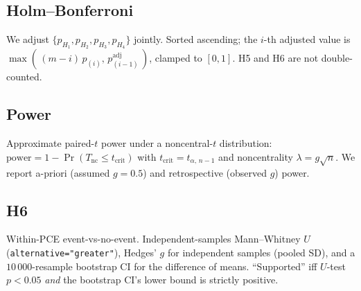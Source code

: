 \subsection{Holm--Bonferroni}
We adjust $\{p_{H_1}, p_{H_2}, p_{H_3}, p_{H_4}\}$ jointly. Sorted ascending; the $i$-th adjusted value is $\max(\,(m-i)\,p_{(i)},\,p_{(i-1)}^{\text{adj}}\,)$, clamped to $[0, 1]$. H5 and H6 are not double-counted.

\subsection{Power}
Approximate paired-$t$ power under a noncentral-$t$ distribution: $\text{power} = 1 - \Pr(T_{\text{nc}} \leq t_{\text{crit}})$ with $t_{\text{crit}}=t_{\alpha,\,n-1}$ and noncentrality $\lambda = g\sqrt{n}$. We report a-priori (assumed $g=0.5$) and retrospective (observed $g$) power.

\subsection{H6}
Within-PCE event-vs-no-event. Independent-samples Mann--Whitney $U$ (\texttt{alternative="greater"}), Hedges' $g$ for independent samples (pooled SD), and a $10\,000$-resample bootstrap CI for the difference of means. ``Supported'' iff $U$-test $p < 0.05$ \emph{and} the bootstrap CI's lower bound is strictly positive.
